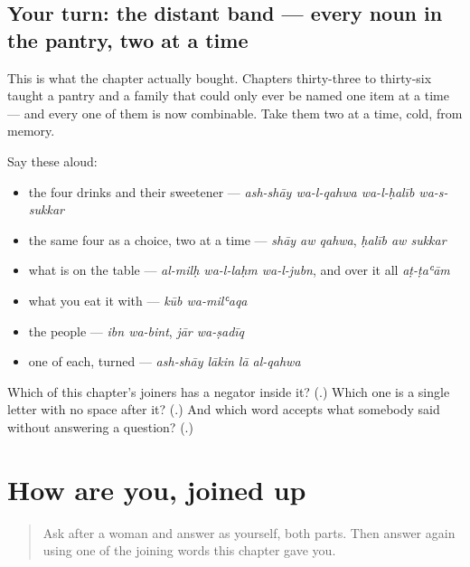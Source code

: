 \subsection*{Your turn: the distant band — every noun in the pantry, two at a time}
This is what the chapter actually bought. Chapters thirty-three to thirty-six taught a pantry and a family that could only ever be named one item at a time — and every one of them is now combinable. Take them two at a time, cold, from memory.

Say these aloud:

\begin{itemize}
\raggedright
  \item the four drinks and their sweetener — \emph{ash-shāy wa-l-qahwa wa-l-ḥalīb wa-s-sukkar}
  \item the same four as a choice, two at a time — \emph{shāy aw qahwa}, \emph{ḥalīb aw sukkar}
  \item what is on the table — \emph{al-milḥ wa-l-laḥm wa-l-jubn}, and over it all \emph{aṭ-ṭaʿām}
  \item what you eat it with — \emph{kūb wa-milʿaqa}
  \item the people — \emph{ibn wa-bint}, \emph{jār wa-ṣadīq}
  \item one of each, turned — \emph{ash-shāy lākin lā al-qahwa}
\end{itemize}

\begin{tcolorbox}[breakable,colback=teal!4,colframe=teal!35!black,title={Before you move on}]
Which of this chapter's joiners has a negator inside it? (\textbf{}.) Which one is a single letter with no space after it? (\textbf{}.) And which word accepts what somebody said without answering a question? (\textbf{}.)
\end{tcolorbox}
\section[\texorpdfstring{\ar{كيف} \ar{حالك؟} · \ar{بخير} … (kayfa ḥāluka? …)}{كيف حالك؟ · بخير … (kayfa ḥāluka? …)}]{How are you, joined up}

\label{lesson:AR-R38-how-are-you-again}



\begin{quote}
Ask after a woman and answer as yourself, both parts. Then answer again using one of the joining words this chapter gave you.
\end{quote}

